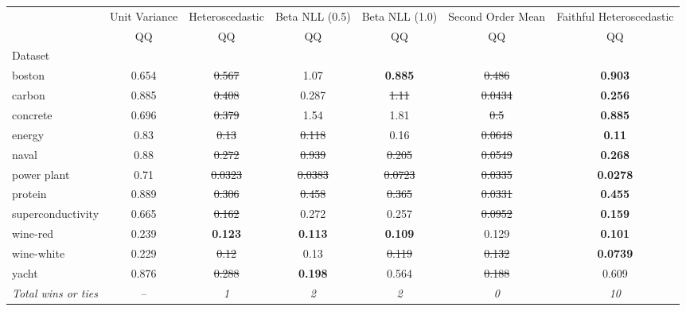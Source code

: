 \begin{tabular}{l|c|c|c|c|c|c}
\toprule
{} & {Unit Variance} & {Heteroscedastic} & {Beta NLL (0.5)} & {Beta NLL (1.0)} & {Second Order Mean} & {Faithful Heteroscedastic} \\
{} & {QQ} & {QQ} & {QQ} & {QQ} & {QQ} & {QQ} \\
{Dataset} & {} & {} & {} & {} & {} & {} \\
\midrule
boston & 0.654 & \sout{0.567} & 1.07 & \textbf{0.885} & \sout{0.486} & \textbf{0.903} \\
carbon & 0.885 & \sout{0.408} & 0.287 & \sout{1.11} & \sout{0.0434} & \textbf{0.256} \\
concrete & 0.696 & \sout{0.379} & 1.54 & 1.81 & \sout{0.5} & \textbf{0.885} \\
energy & 0.83 & \sout{0.13} & \sout{0.118} & 0.16 & \sout{0.0648} & \textbf{0.11} \\
naval & 0.88 & \sout{0.272} & \sout{0.939} & \sout{0.205} & \sout{0.0549} & \textbf{0.268} \\
power plant & 0.71 & \sout{0.0323} & \sout{0.0383} & \sout{0.0723} & \sout{0.0335} & \textbf{0.0278} \\
protein & 0.889 & \sout{0.306} & \sout{0.458} & \sout{0.365} & \sout{0.0331} & \textbf{0.455} \\
superconductivity & 0.665 & \sout{0.162} & 0.272 & 0.257 & \sout{0.0952} & \textbf{0.159} \\
wine-red & 0.239 & \textbf{0.123} & \textbf{0.113} & \textbf{0.109} & 0.129 & \textbf{0.101} \\
wine-white & 0.229 & \sout{0.12} & 0.13 & \sout{0.119} & \sout{0.132} & \textbf{0.0739} \\
yacht & 0.876 & \sout{0.288} & \textbf{0.198} & 0.564 & \sout{0.188} & 0.609 \\
\textit{{Total wins or ties}} & -- & \textit{1} & \textit{2} & \textit{2} & \textit{0} & \textit{10} \\
\bottomrule
\end{tabular}
